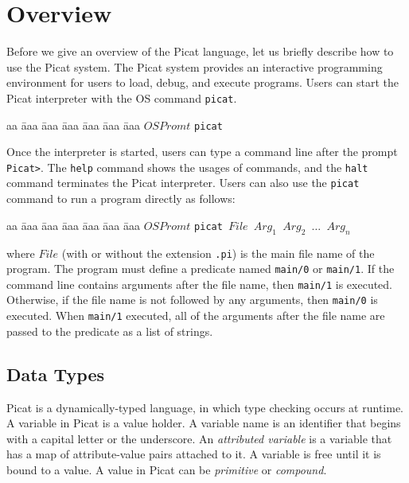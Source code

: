 \chapter{\label{chapter:overview}Overview}
Before we give an overview of the Picat language, let us briefly describe how to use the Picat system. The Picat system provides an interactive programming environment for users to load, debug, and execute programs. Users can start the Picat interpreter with the OS command \texttt{picat}.
\begin{tabbing}
aa \= aaa \= aaa \= aaa \= aaa \= aaa \= aaa \kill
\> \> $OSPromt$ \texttt{picat}
\end{tabbing}
Once the interpreter is started, users can type a command line after the prompt \verb+Picat>+. The \texttt{help} command shows the usages of commands, and the \texttt{halt} command terminates the Picat interpreter. Users can also use the \texttt{picat} command to run a program directly as follows:
\begin{tabbing}
aa \= aaa \= aaa \= aaa \= aaa \= aaa \= aaa \kill
\> \> $OSPromt$ \texttt{picat $File$ $Arg_1$ $Arg_2$ $\ldots$ $Arg_n$}
\end{tabbing}
where $File$ (with or without the extension \texttt{.pi}) is the main file name of the program. The program must define a predicate named \texttt{main/0} or \texttt{main/1}. If the command line contains arguments after the file name, then \texttt{main/1} is executed. Otherwise, if the file name is not followed by any arguments, then \texttt{main/0} is executed. When \texttt{main/1} executed, all of the arguments after the file name are passed to the predicate as a list of strings.


\section{Data Types}
Picat is a dynamically-typed language, in which type checking occurs at runtime. A variable in Picat is a value holder. A variable name is an identifier that begins with a capital letter or the underscore. An \emph{attributed variable} is a variable that has a map of attribute-value pairs attached to it. A variable is free until it is bound to a value. A value in Picat can be \emph{primitive} or \emph{compound}. 

